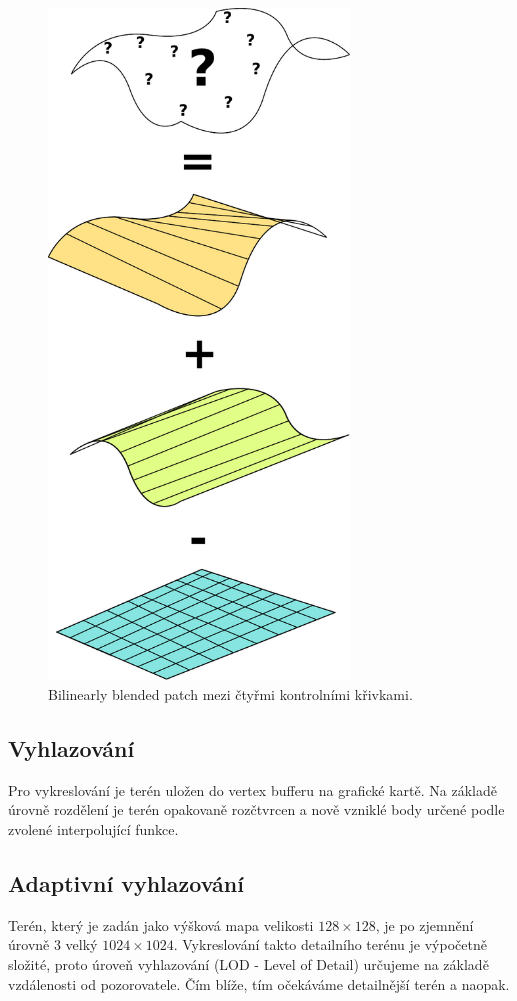 \documentclass{zcu_sp}
\begin{document}
\begin{figure}[ht!]
\centering
	\includegraphics[width=8cm]{coons.pdf}
	\caption{Bilinearly blended patch mezi čtyřmi kontrolními křivkami.}
\end{figure}


\subsection{Vyhlazování}
Pro vykreslování je terén uložen do vertex bufferu na grafické kartě. Na
základě úrovně rozdělení je terén opakovaně rozčtvrcen a nově vzniklé body
určené podle zvolené interpolující funkce.


\subsection{Adaptivní vyhlazování}
Terén, který je zadán jako výšková mapa velikosti $128\times128$, je po
zjemnění úrovně 3 velký $1024\times1024$. Vykreslování takto detailního terénu
je výpočetně složité, proto úroveň vyhlazování (LOD - Level of Detail) určujeme
na základě vzdálenosti od pozorovatele. Čím blíže, tím očekáváme detailnější
terén a naopak. 
\end{document}
